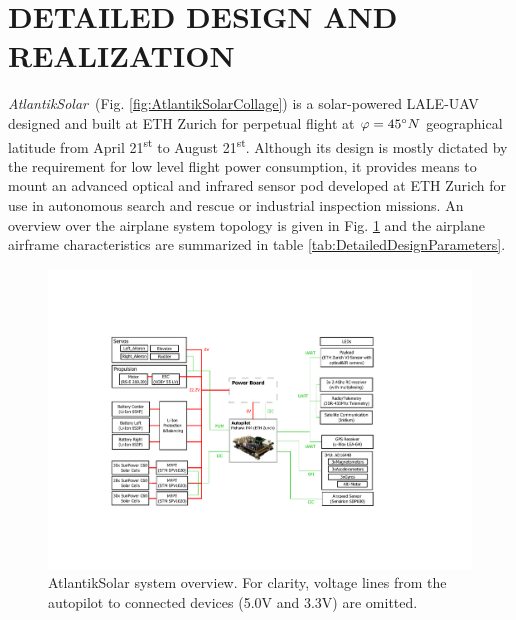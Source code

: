 \section{DETAILED DESIGN AND REALIZATION}\label{sec:detailed_design}

\textit{AtlantikSolar}~(Fig. \ref{fig:AtlantikSolarCollage}) is a solar-powered LALE-UAV designed and built at ETH Zurich for perpetual flight at $\varphi=45\degree N$ geographical latitude from April 21\textsuperscript{st} to August 21\textsuperscript{st}. Although its design is mostly dictated by the requirement for low level flight power consumption, it provides means to mount an advanced optical and infrared sensor pod developed at ETH Zurich for use in autonomous search and rescue or industrial inspection missions. An overview over the airplane system topology is given in Fig. \ref{fig:AtlantikSolar_SystemOverview} and the airplane airframe characteristics are summarized in table \ref{tab:DetailedDesignParameters}.

\begin{figure}[t]
    \centering
     \includegraphics[width=\linewidth]{images/8_AtlantikSolar_Avionics}
    \caption{AtlantikSolar system overview. For clarity, voltage lines from the autopilot to connected devices (5.0V and 3.3V) are omitted.}
    \label{fig:AtlantikSolar_SystemOverview}
\end{figure}


